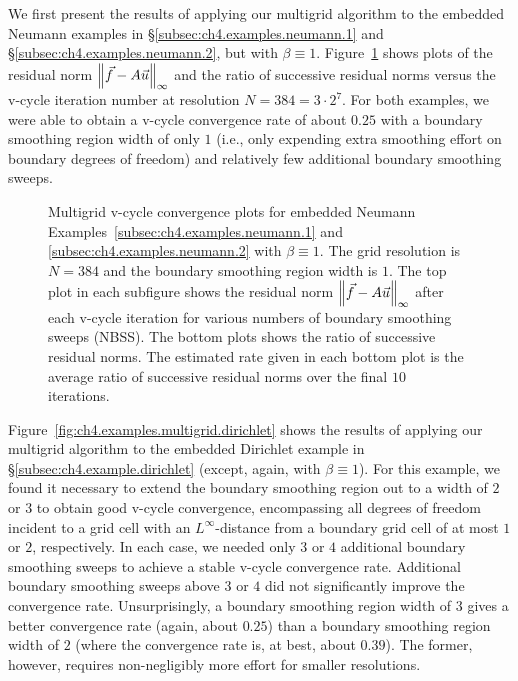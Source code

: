 We first present the results of applying our multigrid algorithm to the embedded Neumann examples in \S\ref{subsec:ch4.examples.neumann.1} and \S\ref{subsec:ch4.examples.neumann.2}, but with $\beta \equiv 1$. Figure~\ref{fig:ch4.examples.multigrid.neumann} shows plots of the residual norm $\left\lVert  \vec{f} - A\vec{u}  \right\rVert_{\infty}$ and the ratio of successive residual norms versus the v-cycle iteration number at resolution $N = 384 = 3 \cdot 2^7$. For both examples, we were able to obtain a v-cycle convergence rate of about $0.25$ with a boundary smoothing region width of only $1$ (i.e., only expending extra smoothing effort on boundary degrees of freedom) and relatively few additional boundary smoothing sweeps.

\setlength{\figureheight}{0.37\columnwidth}
\begin{figure}[htbp]
\begin{center}
\caption{Multigrid v-cycle convergence plots for embedded Neumann Examples~\ref{subsec:ch4.examples.neumann.1} and \ref{subsec:ch4.examples.neumann.2} with $\beta \equiv 1$. The grid resolution is $N = 384$ and the boundary smoothing region width is $1$. The top plot in each subfigure shows the residual norm $\left\lVert  \vec{f} - A\vec{u}  \right\rVert_{\infty}$ after each v-cycle iteration for various numbers of boundary smoothing sweeps (NBSS). The bottom plots shows the ratio of successive residual norms. The estimated rate given in each bottom plot is the average ratio of successive residual norms over the final $10$ iterations.}
\label{fig:ch4.examples.multigrid.neumann}
\end{center}
\end{figure}

Figure~\ref{fig:ch4.examples.multigrid.dirichlet} shows the results of applying our multigrid algorithm to the embedded Dirichlet example in \S\ref{subsec:ch4.example.dirichlet} (except, again, with $\beta \equiv 1$). For this example, we found it necessary to extend the boundary smoothing region out to a width of $2$ or $3$ to obtain good v-cycle convergence, encompassing all degrees of freedom incident to a grid cell with an $L^{\infty}$-distance from a boundary grid cell of at most $1$ or $2$, respectively. In each case, we needed only $3$ or $4$ additional boundary smoothing sweeps to achieve a stable v-cycle convergence rate. Additional boundary smoothing sweeps above $3$ or $4$ did not significantly improve the convergence rate. Unsurprisingly, a boundary smoothing region width of $3$ gives a better convergence rate (again, about $0.25$) than a boundary smoothing region width of $2$ (where the convergence rate is, at best, about $0.39$). The former, however, requires non-negligibly more effort for smaller resolutions.

